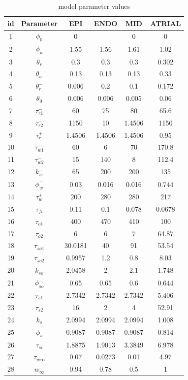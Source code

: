\begin{table}[H]
\centering
\caption{model parameter values}
\label{tab:parametros_minimal}
\begin{tabular}{cccccc}
\hline
id & Parameter         & EPI     & ENDO   & MID  & ATRIAL  \\ \hline
1  & $\phi_0$           & 0       &        & 0 & 0     \\
2  & $\phi_u$          & 1.55    & 1.56   & 1.61 & 1.02  \\
3  & $\theta_r$        & 0.3     & 0.3    & 0.3 & 0.302   \\
4  & $\theta_w$        & 0.13    & 0.13   & 0.13 & 0.33  \\
5  & $\theta_r^-$      & 0.006   & 0.2    & 0.1 & 0.172   \\
6  & $\theta_0$        & 0.006   & 0.006  & 0.005 &0.06  \\
7  & $\tau_{r1}^-$     & 60      & 75     & 80  & 65.6   \\
8  & $\tau_{r2}^-$     & 1150    & 10     & 1.4506 & 1150 \\
9  & $\tau_r^+$        & 1.4506  & 1.4506 & 1.4506 & 0.95 \\
10 & $\tau_{w1}^-$     & 60      & 6      & 70 & 170.8    \\
11 & $\tau_{w2}^-$     & 15      & 140    & 8 & 112.4     \\
12 & $k_w^-$           & 65      & 200    & 200 & 135   \\
13 & $\phi_w^-$        & 0.03    & 0.016  & 0.016 & 0.744 \\
14 & $\tau_w^+$        & 200     & 280    & 280 & 217   \\
15 & $\tau_{fi}$       & 0.11    & 0.1    & 0.078 & 0.0678  \\
16 & $\tau_{o1}$       & 400     & 470    & 410 & 100   \\
17 & $\tau_{o2}$       & 6       & 6      & 7 & 64.87     \\
18 & $\tau_{so1}$      & 30.0181 & 40     & 91 & 53.54    \\
19 & $\tau_{so2}$      & 0.9957  & 1.2    & 0.8 & 8.03   \\
20 & $k_{so}$          & 2.0458  & 2      & 2.1 & 1.748   \\
21 & $\phi_{so}$       & 0.65    & 0.65   & 0.6 & 0.644   \\
22 & $\tau_{s1}$       & 2.7342  & 2.7342 & 2.7342 & 5.406 \\
23 & $\tau_{s2}$       & 16      & 2      & 4 & 52.91     \\
24 & $k_s$             & 2.0994  & 2.0994 & 2.0994 & 1.008 \\
25 & $\phi_s$          & 0.9087  & 0.9087 & 0.9087 & 0.814 \\
26 & $\tau_{si}$       & 1.8875  & 1.9013 & 3.3849 & 6.978 \\
27 & $\tau_{w \infty}$ & 0.07    & 0.0273 & 0.01 & 4.97  \\
28 & $w_{\infty}$         & 0.94    & 0.78   & 0.5 & 1   \\ \hline
\end{tabular}
\end{table}

